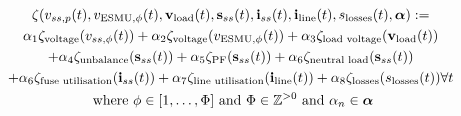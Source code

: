 \begin{multline}
	\zeta(v_{ss,p}(t), v_{\text{ESMU},\phi}(t), \textbf{v}_{\text{load}}(t), \textbf{s}_{ss}(t), \textbf{i}_{ss}(t), \textbf{i}_{\text{line}}(t), s_\text{losses}(t), \boldsymbol{\alpha}) :=\\
	\alpha_1 \zeta_\text{voltage}(v_{ss,\phi}(t))%
	+ \alpha_2 \zeta_\text{voltage}(v_{\text{ESMU},\phi}(t))%
	+ \alpha_3 \zeta_\text{\text{load} voltage}(\textbf{v}_{\text{load}}(t))\\
	+ \alpha_4 \zeta_\text{unbalance}(\textbf{s}_{ss}(t))%
	+ \alpha_5 \zeta_\text{PF}(\textbf{s}_{ss}(t))%
	+ \alpha_6 \zeta_{\text{neutral load}}(\textbf{s}_{ss}(t))\\
	+ \alpha_6 \zeta_\text{fuse utilisation}(\textbf{i}_{ss}(t))%
	+ \alpha_7 \zeta_\text{\text{line} utilisation}(\textbf{i}_{\text{line}}(t))%
	+ \alpha_8 \zeta_\text{losses}(s_\text{losses}(t))%
	 \forall t \\
	 \text{ where } \phi \in [1, \dots, \Phi] \text{ and } \Phi \in \mathbb{Z}^{>0} \text{ and } \alpha_n \in \boldsymbol{\alpha}
\label{ch1:equ:weighted-sum-cost-function}
\end{multline}